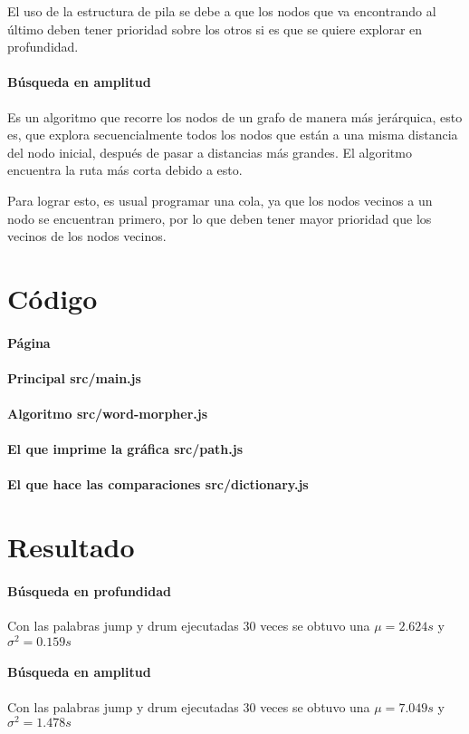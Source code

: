 \documentclass[40pt,a4paper]{article}
\begin{document}
El uso de la estructura de pila se debe a que los nodos que va encontrando
al último deben tener prioridad sobre los otros si es que se quiere explorar
en profundidad.

\paragraph{Búsqueda en amplitud}
Es un algoritmo que recorre los nodos de un grafo de manera más jerárquica,
esto es, que explora secuencialmente todos los nodos que están a una misma
distancia del nodo inicial, después de pasar a distancias más grandes. El
algoritmo encuentra la ruta más corta debido a esto.

Para lograr esto, es usual programar una cola, ya que los nodos vecinos
a un nodo se encuentran primero, por lo que deben tener mayor prioridad
que los vecinos de los nodos vecinos.

\section{Código}

\paragraph{Página}


\paragraph{Principal src/main.js}


\paragraph{Algoritmo src/word-morpher.js}


\paragraph{El que imprime la gráfica src/path.js}


\paragraph{El que hace las comparaciones src/dictionary.js}


\section{Resultado}

\paragraph{Búsqueda en profundidad}
Con las palabras jump y drum ejecutadas 30 veces se obtuvo
una $\mu = 2.624s$ y $\sigma^2 = 0.159s$

\paragraph{Búsqueda en amplitud}
Con las palabras jump y drum ejecutadas 30 veces se obtuvo
una $\mu = 7.049s$ y $\sigma^2 = 1.478s$
\end{document}

